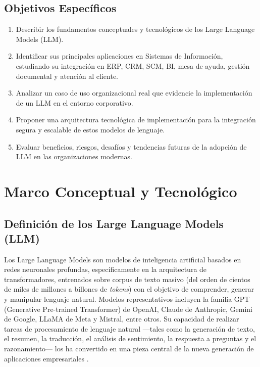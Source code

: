 \documentclass[12pt,a4paper,oneside]{article}
\begin{document}
\subsection{Objetivos Específicos}

\begin{enumerate}[leftmargin=*]
    \item Describir los fundamentos conceptuales y tecnológicos de los Large Language Models (LLM).
    \item Identificar sus principales aplicaciones en Sistemas de Información, estudiando su integración en ERP, CRM, SCM, BI, mesa de ayuda, gestión documental y atención al cliente.
    \item Analizar un caso de uso organizacional real que evidencie la implementación de un LLM en el entorno corporativo.
    \item Proponer una arquitectura tecnológica de implementación para la integración segura y escalable de estos modelos de lenguaje.
    \item Evaluar beneficios, riesgos, desafíos y tendencias futuras de la adopción de LLM en las organizaciones modernas.
\end{enumerate}

\section{Marco Conceptual y Tecnológico}

\subsection{Definición de los Large Language Models (LLM)}

Los Large Language Models son modelos de inteligencia artificial basados en redes neuronales profundas, específicamente en la arquitectura de transformadores, entrenados sobre corpus de texto masivo (del orden de cientos de miles de millones a billones de \textit{tokens}) con el objetivo de comprender, generar y manipular lenguaje natural. Modelos representativos incluyen la familia GPT (Generative Pre-trained Transformer) de OpenAI, Claude de Anthropic, Gemini de Google, LLaMA de Meta y Mistral, entre otros. Su capacidad de realizar tareas de procesamiento de lenguaje natural ---tales como la generación de texto, el resumen, la traducción, el análisis de sentimiento, la respuesta a preguntas y el razonamiento--- los ha convertido en una pieza central de la nueva generación de aplicaciones empresariales \cite{nistAIRMF2023}.
\end{document}
